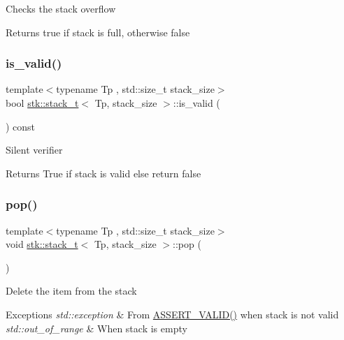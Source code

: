 Checks the stack overflow \begin{DoxyReturn}{Returns}
true if stack is full, otherwise false 
\end{DoxyReturn}
\mbox{\label{classstk_1_1stack__t_a6c1813c8dc347f0cc9ab94a6e120d743}} 
\subsubsection{\texorpdfstring{is\+\_\+valid()}{is\_valid()}}
{\footnotesize\ttfamily template$<$typename Tp , std\+::size\+\_\+t stack\+\_\+size$>$ \\
bool \hyperlink{classstk_1_1stack__t}{stk\+::stack\+\_\+t}$<$ Tp, stack\+\_\+size $>$\+::is\+\_\+valid (\begin{DoxyParamCaption}{ }\end{DoxyParamCaption}) const\hspace{0.3cm}{\ttfamily [private]}}

Silent verifier \begin{DoxyReturn}{Returns}
True if stack is valid else return false 
\end{DoxyReturn}
\mbox{\label{classstk_1_1stack__t_a5be99b150a46b8456643cbc40bcefca8}} 
\subsubsection{\texorpdfstring{pop()}{pop()}}
{\footnotesize\ttfamily template$<$typename Tp , std\+::size\+\_\+t stack\+\_\+size$>$ \\
void \hyperlink{classstk_1_1stack__t}{stk\+::stack\+\_\+t}$<$ Tp, stack\+\_\+size $>$\+::pop (\begin{DoxyParamCaption}{ }\end{DoxyParamCaption})}

Delete the item from the stack 
\begin{DoxyExceptions}{Exceptions}
{\em std\+::exception} & From \hyperlink{stack_8h_a4ad7af85cae2910ffcf6bfbcb8278886}{A\+S\+S\+E\+R\+T\+\_\+\+V\+A\+L\+I\+D()} when stack is not valid \\
\hline
{\em std\+::out\+\_\+of\+\_\+range} & When stack is empty \\
\hline
\end{DoxyExceptions}
\mbox{\label{classstk_1_1stack__t_aad7638faa441f17e91ba9a8f5663be4c}} 

